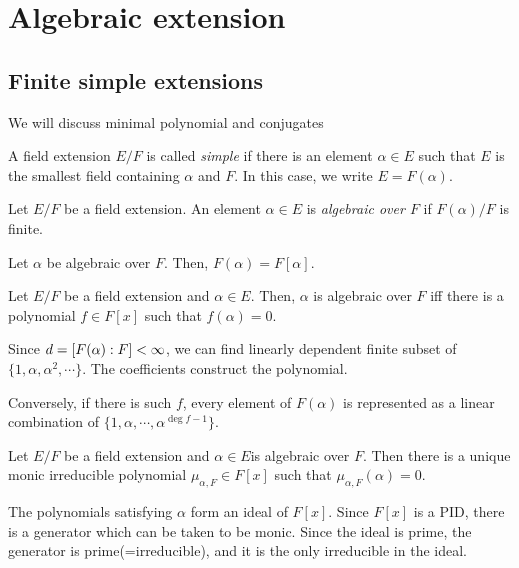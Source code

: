\documentclass{../exp}
\begin{document}
\section{Algebraic extension}

\subsection{Finite simple extensions}
We will discuss minimal polynomial and conjugates

\begin{defn}
A field extension $E/F$ is called \emph{simple} if there is an element $\alpha\in E$ such that $E$ is the smallest field containing $\alpha$ and $F$.
In this case, we write $E=F(\alpha)$.
\end{defn}

\begin{defn}
Let $E/F$ be a field extension.
An element $\alpha\in E$ is \emph{algebraic over $F$} if $F(\alpha)/F$ is finite.
\end{defn}

\begin{prop}
Let $\alpha$ be algebraic over $F$.
Then, $F(\alpha)=F[\alpha]$.
\end{prop}

\begin{thm}
Let $E/F$ be a field extension and $\alpha\in E$.
Then, $\alpha$ is algebraic over $F$ iff there is a polynomial $f\in F[x]$ such that $f(\alpha)=0$.
\end{thm}
\begin{pf}
Since $d=[F(\alpha):F]<\infty$, we can find linearly dependent finite subset of $\{1,\alpha,\alpha^2,\cdots\}$.
The coefficients construct the polynomial.

Conversely, if there is such $f$, every element of $F(\alpha)$ is represented as a linear combination of $\{1,\alpha,\cdots,\alpha^{\deg f-1}\}$.
\end{pf}

\begin{thm}
Let $E/F$ be a field extension and $\alpha\in E$is algebraic over $F$.
Then there is a unique monic irreducible polynomial $\mu_{\alpha,F}\in F[x]$ such that $\mu_{\alpha,F}(\alpha)=0$.
\end{thm}
\begin{pf}
The polynomials satisfying $\alpha$ form an ideal of $F[x]$.
Since $F[x]$ is a PID, there is a generator which can be taken to be monic.
Since the ideal is prime, the generator is prime(=irreducible), and it is the only irreducible in the ideal.
\end{pf}
\end{document}
